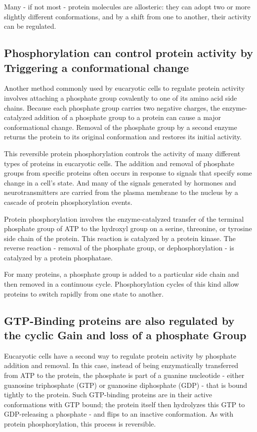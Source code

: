 Many - if not most - protein molecules are allosteric: they can adopt
two or more slightly different conformations, and by a shift from one to
another, their activity can be regulated.

\subsection{Phosphorylation can control protein activity by Triggering a conformational change}

Another method commonly used by eucaryotic cells to regulate protein 
activity involves attaching a phosphate group covalently to one of
its amino acid side chains. Because each phosphate group carries two
negative charges, the enzyme-catalyzed addition of a phosphate group
to a protein can cause a major conformational change.
Removal of the phosphate group by a second enzyme returns the protein to its original
conformation and restores its initial activity.

This reversible protein phosphorylation controls the activity of many
different types of proteins in eucaryotic cells.
The addition and removal of phosphate groups from specific proteins
often occurs in response to signals that specify some change in a cell’s
state. And many of the signals generated by hormones and neurotransmitters are
carried from the plasma membrane to the nucleus by a cascade of protein
phosphorylation events.

Protein phosphorylation involves the enzyme-catalyzed transfer of the
terminal phosphate group of ATP to the hydroxyl group on a serine, threonine, 
or tyrosine side chain of the protein. This reaction is catalyzed by a
protein kinase. The reverse reaction - removal of the phosphate group,
or dephosphorylation - is catalyzed by a protein phosphatase.

For many proteins, a phosphate group is added to a particular side
chain and then removed in a continuous cycle. Phosphorylation cycles
of this kind allow proteins to switch rapidly from one state to another.

\subsection{GTP-Binding proteins are also regulated by the cyclic Gain and loss of a phosphate Group}

Eucaryotic cells have a second way to regulate protein activity by phosphate 
addition and removal. In this case, instead of being enzymatically
transferred from ATP to the protein, the phosphate is part of a guanine
nucleotide - either guanosine triphosphate (GTP) or guanosine diphosphate 
(GDP) - that is bound tightly to the protein. Such GTP-binding
proteins are in their active conformations with GTP bound; the protein
itself then hydrolyzes this GTP to GDP-releasing a phosphate - and flips
to an inactive conformation. As with protein phosphorylation, this process is reversible.

